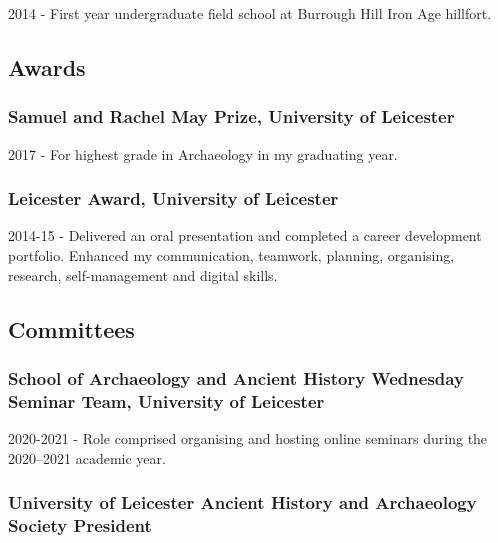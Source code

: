 \documentclass[11pt,a4paper]{article}
\begin{document}
2014 - First year undergraduate field school at Burrough Hill Iron Age
hillfort.

\subsection{Awards}\label{awards}

\subsubsection{\texorpdfstring{\textbf{Samuel and Rachel May Prize,
University of
Leicester}}{Samuel and Rachel May Prize, University of Leicester}}\label{samuel-and-rachel-may-prize-university-of-leicester}

2017 - For highest grade in Archaeology in my graduating year.

\subsubsection{\texorpdfstring{\textbf{Leicester Award, University of
Leicester}}{Leicester Award, University of Leicester}}\label{leicester-award-university-of-leicester}

2014-15 - Delivered an oral presentation and completed a career
development portfolio. Enhanced my communication, teamwork, planning,
organising, research, self-management and digital skills.

\subsection{Committees}\label{committees}

\subsubsection{\texorpdfstring{\textbf{School of Archaeology and Ancient
History Wednesday Seminar Team, University of
Leicester}}{School of Archaeology and Ancient History Wednesday Seminar Team, University of Leicester}}\label{school-of-archaeology-and-ancient-history-wednesday-seminar-team-university-of-leicester}

2020-2021 - Role comprised organising and hosting online seminars during
the 2020--2021 academic year.

\subsubsection{\texorpdfstring{\textbf{University of Leicester Ancient
History and Archaeology Society}
President}{University of Leicester Ancient History and Archaeology Society President}}\label{university-of-leicester-ancient-history-and-archaeology-society-president}
\end{document}
